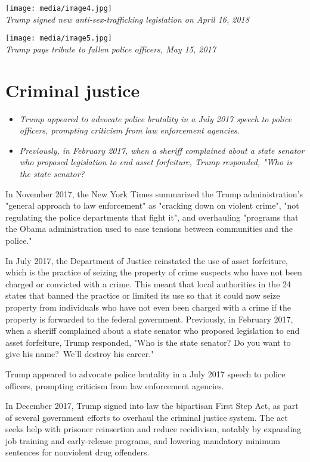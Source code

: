 \texttt{[image: media/image4.jpg]}\\
\emph{Trump signed new anti-sex-trafficking legislation on April 16,
2018}

\texttt{[image: media/image5.jpg]}\\
\emph{Trump pays tribute to fallen police officers, May 15, 2017}

\section{Criminal justice}\label{criminal-justice}

\begin{itemize}
\item
  \emph{Trump appeared to advocate police brutality in a July 2017
  speech to police officers, prompting criticism from law enforcement
  agencies.}
\item
  \emph{Previously, in February 2017, when a sheriff complained about a
  state senator who proposed legislation to end asset forfeiture, Trump
  responded, "Who is the state senator?}
\end{itemize}

In November 2017, the New York Times summarized the Trump
administration's "general approach to law enforcement" as "cracking down
on violent crime", "not regulating the police departments that fight
it", and overhauling "programs that the Obama administration used to
ease tensions between communities and the police."

In July 2017, the Department of Justice reinstated the use of asset
forfeiture, which is the practice of seizing the property of crime
suspects who have not been charged or convicted with a crime. This meant
that local authorities in the 24 states that banned the practice or
limited its use so that it could now seize property from individuals who
have not even been charged with a crime if the property is forwarded to
the federal government. Previously, in February 2017, when a sheriff
complained about a state senator who proposed legislation to end asset
forfeiture, Trump responded, "Who is the state senator? Do you want to
give his name?~We'll destroy his career."

Trump appeared to advocate police brutality in a July 2017 speech to
police officers, prompting criticism from law enforcement agencies.

In December 2017, Trump signed into law the bipartisan First Step Act,
as part of several government efforts to overhaul the criminal justice
system. The act seeks help with prisoner reinsertion and reduce
recidivism, notably by expanding job training and early-release
programs, and lowering mandatory minimum sentences for nonviolent drug
offenders.

